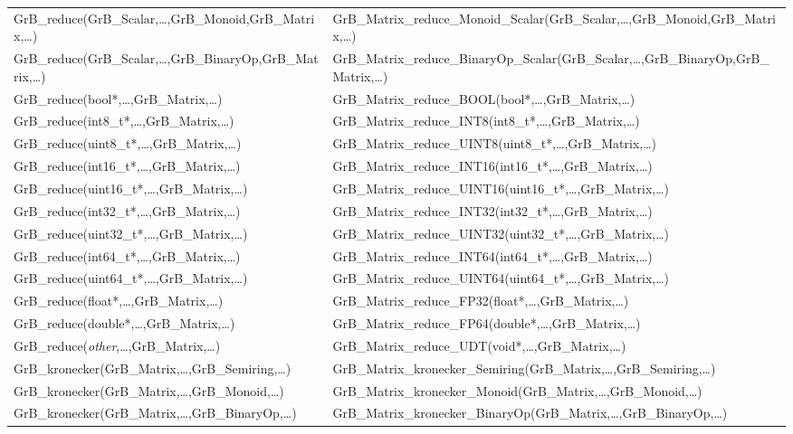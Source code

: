 \begin{landscape}
\begin{table}[htb]
{\begin{tabular}{l|l}
{\sf GrB\_reduce(GrB\_Scalar,\ldots,GrB\_Monoid,GrB\_Matrix,\ldots)}			& {\sf GrB\_Matrix\_reduce\_Monoid\_Scalar(GrB\_Scalar,\ldots,GrB\_Monoid,GrB\_Matrix,\ldots)} \\ 
{\sf GrB\_reduce(GrB\_Scalar,\ldots,GrB\_BinaryOp,GrB\_Matrix,\ldots)}			& {\sf GrB\_Matrix\_reduce\_BinaryOp\_Scalar(GrB\_Scalar,\ldots,GrB\_BinaryOp,GrB\_Matrix,\ldots)} \\ 
{\sf GrB\_reduce(bool*,\ldots,GrB\_Matrix,\ldots)}					& {\sf GrB\_Matrix\_reduce\_BOOL(bool*,\ldots,GrB\_Matrix,\ldots)} \\
{\sf GrB\_reduce(int8\_t*,\ldots,GrB\_Matrix,\ldots)}					& {\sf GrB\_Matrix\_reduce\_INT8(int8\_t*,\ldots,GrB\_Matrix,\ldots)} \\
{\sf GrB\_reduce(uint8\_t*,\ldots,GrB\_Matrix,\ldots)}					& {\sf GrB\_Matrix\_reduce\_UINT8(uint8\_t*,\ldots,GrB\_Matrix,\ldots)} \\
{\sf GrB\_reduce(int16\_t*,\ldots,GrB\_Matrix,\ldots)}					& {\sf GrB\_Matrix\_reduce\_INT16(int16\_t*,\ldots,GrB\_Matrix,\ldots)} \\
{\sf GrB\_reduce(uint16\_t*,\ldots,GrB\_Matrix,\ldots)}					& {\sf GrB\_Matrix\_reduce\_UINT16(uint16\_t*,\ldots,GrB\_Matrix,\ldots)} \\
{\sf GrB\_reduce(int32\_t*,\ldots,GrB\_Matrix,\ldots)}					& {\sf GrB\_Matrix\_reduce\_INT32(int32\_t*,\ldots,GrB\_Matrix,\ldots)} \\
{\sf GrB\_reduce(uint32\_t*,\ldots,GrB\_Matrix,\ldots)}					& {\sf GrB\_Matrix\_reduce\_UINT32(uint32\_t*,\ldots,GrB\_Matrix,\ldots)} \\
{\sf GrB\_reduce(int64\_t*,\ldots,GrB\_Matrix,\ldots)}					& {\sf GrB\_Matrix\_reduce\_INT64(int64\_t*,\ldots,GrB\_Matrix,\ldots)} \\
{\sf GrB\_reduce(uint64\_t*,\ldots,GrB\_Matrix,\ldots)}					& {\sf GrB\_Matrix\_reduce\_UINT64(uint64\_t*,\ldots,GrB\_Matrix,\ldots)} \\
{\sf GrB\_reduce(float*,\ldots,GrB\_Matrix,\ldots)}					& {\sf GrB\_Matrix\_reduce\_FP32(float*,\ldots,GrB\_Matrix,\ldots)} \\
{\sf GrB\_reduce(double*,\ldots,GrB\_Matrix,\ldots)}					& {\sf GrB\_Matrix\_reduce\_FP64(double*,\ldots,GrB\_Matrix,\ldots)} \\
{\sf GrB\_reduce(\emph{other},\ldots,GrB\_Matrix,\ldots)}				& {\sf GrB\_Matrix\_reduce\_UDT(void*,\ldots,GrB\_Matrix,\ldots)} \\ 
\hline

{\sf GrB\_kronecker(GrB\_Matrix,\ldots,GrB\_Semiring,\ldots)} 				& {\sf GrB\_Matrix\_kronecker\_Semiring(GrB\_Matrix,\ldots,GrB\_Semiring,\ldots)} \\
{\sf GrB\_kronecker(GrB\_Matrix,\ldots,GrB\_Monoid,\ldots)} 				& {\sf GrB\_Matrix\_kronecker\_Monoid(GrB\_Matrix,\ldots,GrB\_Monoid,\ldots)} \\
{\sf GrB\_kronecker(GrB\_Matrix,\ldots,GrB\_BinaryOp,\ldots)} 				& {\sf GrB\_Matrix\_kronecker\_BinaryOp(GrB\_Matrix,\ldots,GrB\_BinaryOp,\ldots)} \\ 
\hline
\end{tabular}
}
\label{Tab:NonPolymorphic6}
\end{table}
\end{landscape}
